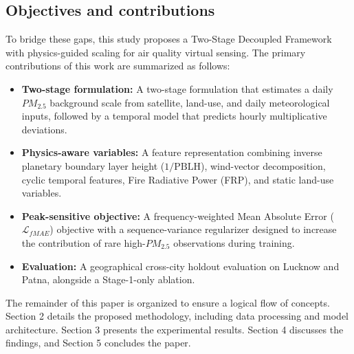 \subsection{Objectives and contributions}
To bridge these gaps, this study proposes a Two-Stage Decoupled Framework with physics-guided scaling for air quality virtual sensing. The primary contributions of this work are summarized as follows:
\begin{itemize}
    \item \textbf{Two-stage formulation:} A two-stage formulation that estimates a daily $PM_{2.5}$ background scale from satellite, land-use, and daily meteorological inputs, followed by a temporal model that predicts hourly multiplicative deviations.
    \item \textbf{Physics-aware variables:} A feature representation combining inverse planetary boundary layer height ($1/\text{PBLH}$), wind-vector decomposition, cyclic temporal features, Fire Radiative Power (FRP), and static land-use variables.
    \item \textbf{Peak-sensitive objective:} A frequency-weighted Mean Absolute Error ($\mathcal{L}_{fMAE}$) objective with a sequence-variance regularizer designed to increase the contribution of rare high-$PM_{2.5}$ observations during training.
    \item \textbf{Evaluation:} A geographical cross-city holdout evaluation on Lucknow and Patna, alongside a Stage-1-only ablation.
\end{itemize}
\vspace{0.5cm}
\noindent The remainder of this paper is organized to ensure a logical flow of concepts. Section 2 details the proposed methodology, including data processing and model architecture. Section 3 presents the experimental results. Section 4 discusses the findings, and Section 5 concludes the paper.

